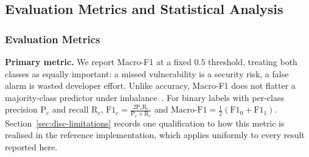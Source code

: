 \documentclass[a4paper,twoside]{article}
\begin{document}
\begin{table}[t]
  \centering
  \caption{Continual learning strategies with mechanisms and memory requirements. Reproduced from the conference version~\citep{Dou2026ICISSP}.}
  \label{tab:cl_strategies}
\end{table}

\subsection{Evaluation Metrics and Statistical Analysis}
\label{sec:metrics}

\subsubsection{Evaluation Metrics}
\label{sec:eval-metrics}

\noindent
\textbf{Primary metric.} We report Macro-F1 at a fixed $0.5$ threshold, treating both classes as equally important: a missed vulnerability is a security risk, a false alarm is wasted developer effort. Unlike accuracy, Macro-F1 does not flatter a majority-class predictor under imbalance~\citep{Saito2015PRBetter}. For binary labels with per-class precision $\mathrm{P}_c$ and recall $\mathrm{R}_c$, $\mathrm{F1}_c = \tfrac{2\mathrm{P}_c\mathrm{R}_c}{\mathrm{P}_c+\mathrm{R}_c}$ and $\mathrm{Macro\text{-}F1} = \tfrac{1}{2}(\mathrm{F1}_0+\mathrm{F1}_1)$. Section~\ref{sec:disc-limitations} records one qualification to how this metric is realised in the reference implementation, which applies uniformly to every result reported here.
\end{document}
